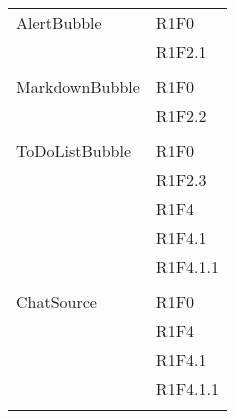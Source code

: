 \begin{center}
\begin{longtable}{|p{7cm}|p{5cm}|}
		AlertBubble & R1F0 \\ & R1F2.1 \\ & \\ \hline
		MarkdownBubble & R1F0 \\ & R1F2.2 \\ & \\ \hline
		ToDoListBubble & R1F0 \\ & R1F2.3 \\ & R1F4 \\ & R1F4.1 \\ & R1F4.1.1 \\ & \\ \hline
		ChatSource & R1F0 \\ & R1F4 \\ & R1F4.1 \\ & R1F4.1.1 \\ & \\ \hline
	\end{longtable}
\end{center}
